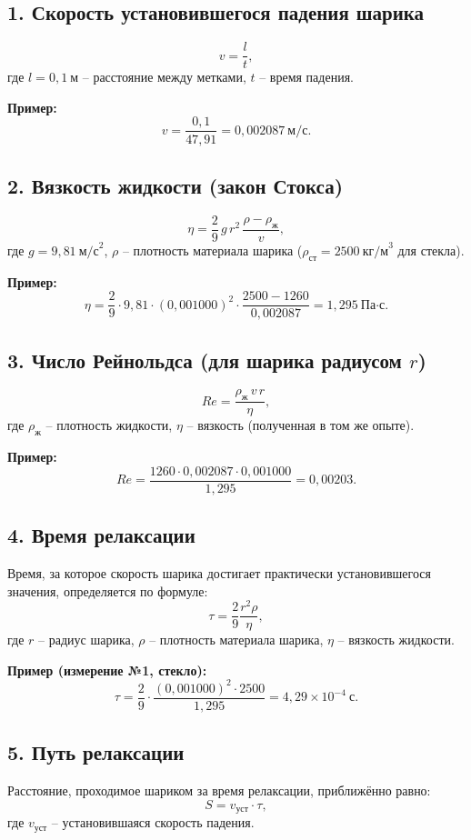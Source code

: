 \documentclass[a4paper, 12pt]{article}
\begin{document}
\subsection*{1. Скорость установившегося падения шарика}
\[
v = \frac{l}{t},
\]
где \(l = 0{,}1\ \text{м}\) – расстояние между метками, \(t\) – время падения.

\textbf{Пример:}
\[
v = \frac{0{,}1}{47{,}91} = 0{,}002087\ \text{м/с}.
\]

\subsection*{2. Вязкость жидкости (закон Стокса)}
\[
\eta = \frac{2}{9}\, g\, r^{2}\, \frac{\rho - \rho_{\text{ж}}}{v},
\]
где \(g = 9{,}81\ \text{м/с}^{2}\), \(\rho\) – плотность материала шарика (\(\rho_{\text{ст}} = 2500\ \text{кг/м}^{3}\) для стекла).

\textbf{Пример:}
\[
\eta = \frac{2}{9} \cdot 9{,}81 \cdot (0{,}001000)^{2} \cdot \frac{2500 - 1260}{0{,}002087} = 1{,}295\ \text{Па·с}.
\]

\subsection*{3. Число Рейнольдса (для шарика радиусом \(r\))}
\[
Re = \frac{\rho_{\text{ж}} \, v \, r}{\eta},
\]
где \(\rho_{\text{ж}}\) – плотность жидкости, \(\eta\) – вязкость (полученная в том же опыте).

\textbf{Пример:}
\[
Re = \frac{1260 \cdot 0{,}002087 \cdot 0{,}001000}{1{,}295} = 0{,}00203.
\]

\subsection*{4. Время релаксации}
Время, за которое скорость шарика достигает практически установившегося значения, определяется по формуле:
\[
\tau = \frac{2}{9} \frac{r^{2} \rho}{\eta},
\]
где \(r\) – радиус шарика, \(\rho\) – плотность материала шарика, \(\eta\) – вязкость жидкости.

\textbf{Пример (измерение №1, стекло):}
\[
\tau = \frac{2}{9} \cdot \frac{(0{,}001000)^{2} \cdot 2500}{1{,}295} = 4{,}29 \times 10^{-4}\ \text{с}.
\]

\subsection*{5. Путь релаксации}
Расстояние, проходимое шариком за время релаксации, приближённо равно:
\[
S = v_{\text{уст}} \cdot \tau,
\]
где \(v_{\text{уст}}\) – установившаяся скорость падения.
\end{document}
